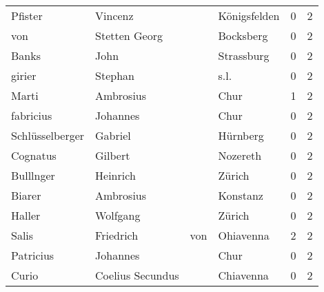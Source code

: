 \begin{tabular}{llllrr}
                  Pfister &                            Vincenz &             &                                Königsfelden &          0 &         2 \\
                      von &                      Stetten Georg &             &                                   Bocksberg &          0 &         2 \\
                    Banks &                               John &             &                                  Strassburg &          0 &         2 \\
                   girier &                            Stephan &             &                                        s.l. &          0 &         2 \\
                    Marti &                          Ambrosius &             &                                        Chur &          1 &         2 \\
                fabricius &                           Johannes &             &                                        Chur &          0 &         2 \\
          Schlüsselberger &                            Gabriel &             &                                    Hürnberg &          0 &         2 \\
                 Cognatus &                            Gilbert &             &                                    Nozereth &          0 &         2 \\
                Bulllnger &                           Heinrich &             &                                      Zürich &          0 &         2 \\
                   Biarer &                          Ambrosius &             &                                    Konstanz &          0 &         2 \\
                   Haller &                           Wolfgang &             &                                      Zürich &          0 &         2 \\
                    Salis &                          Friedrich &         von &                                   Ohiavenna &          2 &         2 \\
                Patricius &                           Johannes &             &                                        Chur &          0 &         2 \\
                    Curio &                   Coelius Secundus &             &                                   Chiavenna &          0 &         2 \\

\end{tabular}
